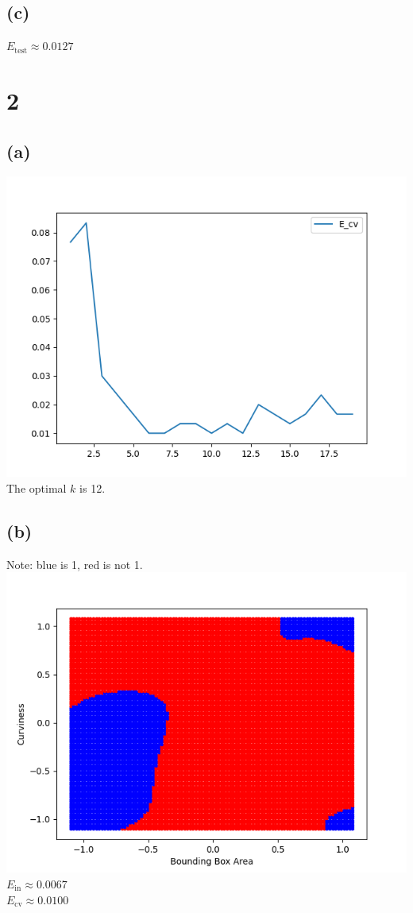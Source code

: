 \documentclass{article}
\begin{document}
	\subsection*{(c)}
		$E_\text{test} \approx 0.0127$
		
	\section*{2}
	\subsection*{(a)}
		\includegraphics[scale=0.8]{2a.png}\\
		The optimal $k$ is 12.
	\subsection*{(b)}
		Note: blue is 1, red is not 1.\\
		\includegraphics[scale=0.8]{2b.png}\\
		$E_\text{in} \approx 0.0067$\\
		$E_\text{cv} \approx 0.0100$
\end{document}
